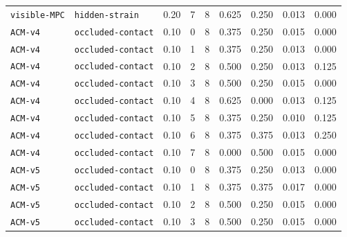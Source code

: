 \documentclass{article}
\begin{document}
\begin{center}
\begin{tabular}{llccccccc}
\texttt{visible-MPC} & \texttt{hidden-strain} & 0.20 & 7 & 8 & 0.625 & 0.250 & 0.013 & 0.000 \\
\texttt{ACM-v4} & \texttt{occluded-contact} & 0.10 & 0 & 8 & 0.375 & 0.250 & 0.015 & 0.000 \\
\texttt{ACM-v4} & \texttt{occluded-contact} & 0.10 & 1 & 8 & 0.375 & 0.250 & 0.013 & 0.000 \\
\texttt{ACM-v4} & \texttt{occluded-contact} & 0.10 & 2 & 8 & 0.500 & 0.250 & 0.013 & 0.125 \\
\texttt{ACM-v4} & \texttt{occluded-contact} & 0.10 & 3 & 8 & 0.500 & 0.250 & 0.015 & 0.000 \\
\texttt{ACM-v4} & \texttt{occluded-contact} & 0.10 & 4 & 8 & 0.625 & 0.000 & 0.013 & 0.125 \\
\texttt{ACM-v4} & \texttt{occluded-contact} & 0.10 & 5 & 8 & 0.375 & 0.250 & 0.010 & 0.125 \\
\texttt{ACM-v4} & \texttt{occluded-contact} & 0.10 & 6 & 8 & 0.375 & 0.375 & 0.013 & 0.250 \\
\texttt{ACM-v4} & \texttt{occluded-contact} & 0.10 & 7 & 8 & 0.000 & 0.500 & 0.015 & 0.000 \\
\texttt{ACM-v5} & \texttt{occluded-contact} & 0.10 & 0 & 8 & 0.375 & 0.250 & 0.013 & 0.000 \\
\texttt{ACM-v5} & \texttt{occluded-contact} & 0.10 & 1 & 8 & 0.375 & 0.375 & 0.017 & 0.000 \\
\texttt{ACM-v5} & \texttt{occluded-contact} & 0.10 & 2 & 8 & 0.500 & 0.250 & 0.015 & 0.000 \\
\texttt{ACM-v5} & \texttt{occluded-contact} & 0.10 & 3 & 8 & 0.500 & 0.250 & 0.015 & 0.000 \\
\bottomrule
\end{tabular}
\end{center}
\end{document}
